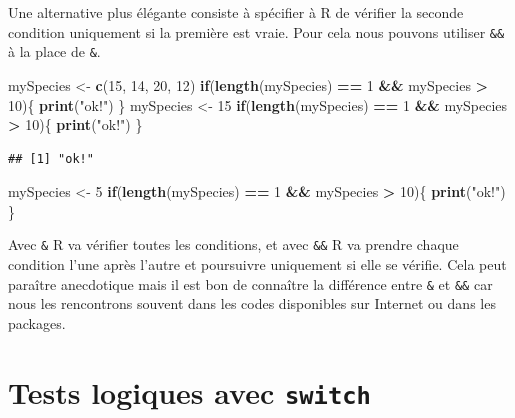 \documentclass[
]{book}
\newenvironment{Shaded}{\begin{snugshade}}{\end{snugshade}}
\newcommand{\ControlFlowTok}[1]{\textcolor[rgb]{0.13,0.29,0.53}{\textbf{#1}}}
\newcommand{\DecValTok}[1]{\textcolor[rgb]{0.00,0.00,0.81}{#1}}
\newcommand{\KeywordTok}[1]{\textcolor[rgb]{0.13,0.29,0.53}{\textbf{#1}}}
\newcommand{\NormalTok}[1]{#1}
\newcommand{\OperatorTok}[1]{\textcolor[rgb]{0.81,0.36,0.00}{\textbf{#1}}}
\newcommand{\StringTok}[1]{\textcolor[rgb]{0.31,0.60,0.02}{#1}}
\begin{document}
Une alternative plus élégante consiste à spécifier à R de vérifier la seconde condition uniquement si la première est vraie. Pour cela nous pouvons utiliser \texttt{\&\&} à la place de \texttt{\&}.

\begin{Shaded}
\begin{Highlighting}[]
\NormalTok{mySpecies <-}\StringTok{ }\KeywordTok{c}\NormalTok{(}\DecValTok{15}\NormalTok{, }\DecValTok{14}\NormalTok{, }\DecValTok{20}\NormalTok{, }\DecValTok{12}\NormalTok{)}
\ControlFlowTok{if}\NormalTok{(}\KeywordTok{length}\NormalTok{(mySpecies) }\OperatorTok{==}\StringTok{ }\DecValTok{1} \OperatorTok{&&}\StringTok{ }\NormalTok{mySpecies }\OperatorTok{>}\StringTok{ }\DecValTok{10}\NormalTok{)\{}
  \KeywordTok{print}\NormalTok{(}\StringTok{"ok!"}\NormalTok{)}
\NormalTok{\}}
\NormalTok{mySpecies <-}\StringTok{ }\DecValTok{15}
\ControlFlowTok{if}\NormalTok{(}\KeywordTok{length}\NormalTok{(mySpecies) }\OperatorTok{==}\StringTok{ }\DecValTok{1} \OperatorTok{&&}\StringTok{ }\NormalTok{mySpecies }\OperatorTok{>}\StringTok{ }\DecValTok{10}\NormalTok{)\{}
  \KeywordTok{print}\NormalTok{(}\StringTok{"ok!"}\NormalTok{)}
\NormalTok{\}}
\end{Highlighting}
\end{Shaded}

\begin{verbatim}
## [1] "ok!"
\end{verbatim}

\begin{Shaded}
\begin{Highlighting}[]
\NormalTok{mySpecies <-}\StringTok{ }\DecValTok{5}
\ControlFlowTok{if}\NormalTok{(}\KeywordTok{length}\NormalTok{(mySpecies) }\OperatorTok{==}\StringTok{ }\DecValTok{1} \OperatorTok{&&}\StringTok{ }\NormalTok{mySpecies }\OperatorTok{>}\StringTok{ }\DecValTok{10}\NormalTok{)\{}
  \KeywordTok{print}\NormalTok{(}\StringTok{"ok!"}\NormalTok{)}
\NormalTok{\}}
\end{Highlighting}
\end{Shaded}

Avec \texttt{\&} R va vérifier toutes les conditions, et avec \texttt{\&\&} R va prendre chaque condition l'une après l'autre et poursuivre uniquement si elle se vérifie. Cela peut paraître anecdotique mais il est bon de connaître la différence entre \texttt{\&} et \texttt{\&\&} car nous les rencontrons souvent dans les codes disponibles sur Internet ou dans les packages.

\hypertarget{l17switch}{%
\section{\texorpdfstring{Tests logiques avec \texttt{switch}}{Tests logiques avec switch}}\label{l17switch}}
\end{document}
